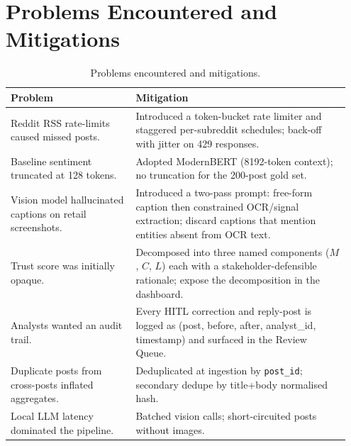 \chapter{Problems Encountered and Mitigations}\label{ch:problems}

\begin{table}[htbp]\centering
\caption{Problems encountered and mitigations.}\label{tab:problems}
\small
\begin{tabular}{@{}p{0.35\linewidth}p{0.60\linewidth}@{}}\toprule
\bfseries Problem & \bfseries Mitigation\\\midrule
Reddit RSS rate-limits caused missed posts. &
Introduced a token-bucket rate limiter and staggered per-subreddit
schedules; back-off with jitter on 429 responses.\\
Baseline sentiment truncated at 128 tokens. &
Adopted ModernBERT (8192-token context); no truncation for the 200-post
gold set.\\
Vision model hallucinated captions on retail screenshots. &
Introduced a two-pass prompt: free-form caption then constrained OCR/signal
extraction; discard captions that mention entities absent from OCR text.\\
Trust score was initially opaque. &
Decomposed into three named components ($M$, $C$, $L$) each with a
stakeholder-defensible rationale; expose the decomposition in the dashboard.\\
Analysts wanted an audit trail. &
Every HITL correction and reply-post is logged as (post, before, after,
analyst\_id, timestamp) and surfaced in the Review Queue.\\
Duplicate posts from cross-posts inflated aggregates. &
Deduplicated at ingestion by \texttt{post\_id}; secondary dedupe by
title+body normalised hash.\\
Local LLM latency dominated the pipeline. &
Batched vision calls; short-circuited posts without images.\\\bottomrule
\end{tabular}
\end{table}
